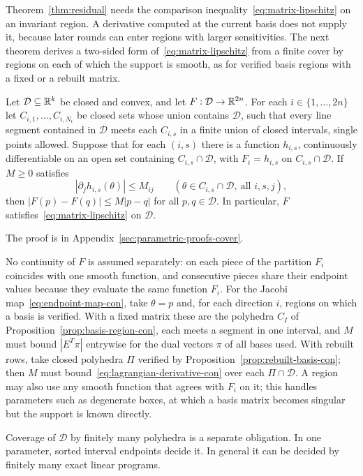 Theorem~\ref{thm:residual} needs the comparison
inequality~\eqref{eq:matrix-lipschitz} on an invariant region. A
derivative computed at the current basis does not supply it, because later
rounds can enter regions with larger sensitivities. The next theorem
derives a two-sided form of~\eqref{eq:matrix-lipschitz} from a finite cover
by regions on each of which the support is smooth, as for verified basis
regions with a fixed or a rebuilt matrix.

\begin{theorem}\label{thm:cover-con}
Let $\mathcal D\subseteq\mathbb{R}^k$ be closed and convex, and let
$F:\mathcal D\to\mathbb{R}^{2n}$. For each $i\in\{1,\ldots,2n\}$ let
$C_{i,1},\ldots,C_{i,N_i}$ be closed sets whose union contains $\mathcal D$,
such that every line segment contained in $\mathcal D$ meets each
$C_{i,s}$ in a finite union of closed intervals, single points allowed.
Suppose that for each $(i,s)$ there is a function $h_{i,s}$, continuously
differentiable on an open set containing $C_{i,s}\cap\mathcal D$, with
$F_i=h_{i,s}$ on $C_{i,s}\cap\mathcal D$. If $M\ge0$ satisfies
\[
 |\partial_jh_{i,s}(\theta)|\le M_{ij}
 \qquad(\theta\in C_{i,s}\cap\mathcal D,\ \text{all }i,s,j),
\]
then $|F(p)-F(q)|\le M|p-q|$ for all $p,q\in\mathcal D$. In particular,
$F$ satisfies~\eqref{eq:matrix-lipschitz} on $\mathcal D$.
\end{theorem}

The proof is in Appendix~\ref{sec:parametric-proofs-cover}.

No continuity of $F$ is assumed separately: on each piece of the partition
$F_i$ coincides with one smooth function, and consecutive pieces share their
endpoint values because they evaluate the same function $F_i$. For the
Jacobi map~\eqref{eq:endpoint-map-con}, take $\theta=p$ and, for each
direction $i$, regions on which a basis is verified. With a fixed matrix
these are the polyhedra $C_I$ of Proposition~\ref{prop:basis-region-con},
each meets a segment in one interval, and $M$ must bound $|E^T\pi|$
entrywise for the dual vectors $\pi$ of all bases used. With rebuilt rows,
take closed polyhedra $\Pi$ verified by
Proposition~\ref{prop:rebuilt-basis-con}; then $M$ must
bound~\eqref{eq:lagrangian-derivative-con} over each $\Pi\cap\mathcal D$.
A region may also use any smooth function that agrees with $F_i$ on it;
this handles parameters such as degenerate boxes, at which a basis matrix
becomes singular but the support is known directly.

Coverage of $\mathcal D$ by finitely many polyhedra is a separate
obligation. In one parameter, sorted interval endpoints decide it. In
general it can be decided by finitely many exact linear programs.


